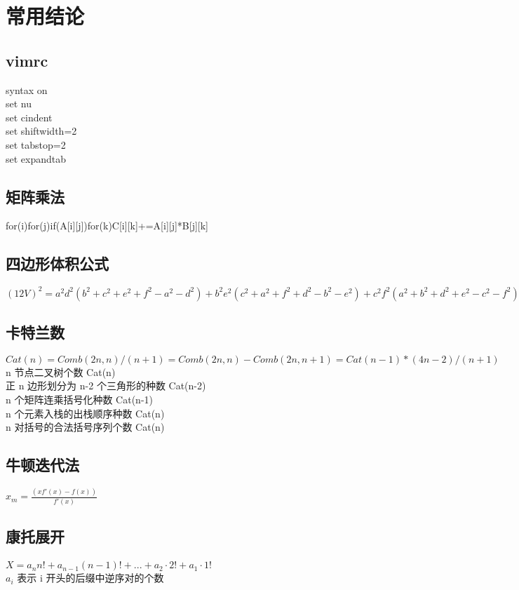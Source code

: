 \section{常用结论}
\subsection{vimrc}
syntax on \\
set nu \\
set cindent \\
set shiftwidth=2 \\
set tabstop=2 \\ 
set expandtab \\
\subsection{矩阵乘法}
for(i)for(j)if(A[i][j])for(k)C[i][k]+=A[i][j]*B[j][k]
\subsection{四边形体积公式}
$ (12V)^2 = a^2d^2(b^2 + c^2 + e^2 + f^2 − a^2 − d^2) + b^2e^2(c^2 + a^2 + f^2 + d^2 − b^2 − e^2) + c^2f^2(a^2 + b^2 + d^2 + e^2 −c^2 − f^2) − a^2b^2c^2 − a^2e^2f^2 − d^2b^2f^2 − d^2e^2c^2 $
\subsection{卡特兰数}
$ Cat(n)=Comb(2n,n)/(n+1)=Comb(2n,n)-Comb(2n,n+1)=Cat(n-1)*(4n-2)/(n+1) $ \\
n 节点二叉树个数 Cat(n) \\
正 n 边形划分为 n-2 个三角形的种数 Cat(n-2) \\
n 个矩阵连乘括号化种数 Cat(n-1) \\
n 个元素入栈的出栈顺序种数 Cat(n) \\
n 对括号的合法括号序列个数 Cat(n) \\
\subsection{牛顿迭代法}
$ x_m = \frac{(xf'(x)-f(x))}{f'(x)} $
\subsection{康托展开}
\paragraph{}
$ X = a_n  n! + a_{n-1}  (n - 1)! + ... + a_2 \cdot 2! + a_1 \cdot 1! $ \\
$ a_i $ 表示 i 开头的后缀中逆序对的个数
